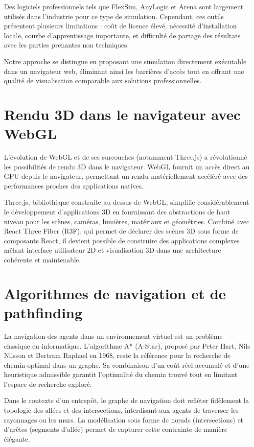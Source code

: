 \documentclass[12pt,a4paper]{report}
\begin{document}
Des logiciels professionnels tels que FlexSim, AnyLogic et Arena sont largement utilis\'es dans l'industrie pour ce type de simulation. Cependant, ces outils pr\'esentent plusieurs limitations : co\^ut de licence \'elev\'e, n\'ecessit\'e d'installation locale, courbe d'apprentissage importante, et difficult\'e de partage des r\'esultats avec les parties prenantes non techniques.

Notre approche se distingue en proposant une simulation directement ex\'ecutable dans un navigateur web, \'eliminant ainsi les barri\`eres d'acc\`es tout en offrant une qualit\'e de visualisation comparable aux solutions professionnelles.

\section{Rendu 3D dans le navigateur avec WebGL}

L'\'evolution de WebGL et de ses surcouches (notamment Three.js) a r\'evolutionn\'e les possibilit\'es de rendu 3D dans le navigateur. WebGL fournit un acc\`es direct au GPU depuis le navigateur, permettant un rendu mat\'eriellement acc\'el\'er\'e avec des performances proches des applications natives.

Three.js, biblioth\`eque construite au-dessus de WebGL, simplifie consid\'erablement le d\'eveloppement d'applications 3D en fournissant des abstractions de haut niveau pour les sc\`enes, cam\'eras, lumi\`eres, mat\'eriaux et g\'eom\'etries. Combin\'e avec React Three Fiber (R3F), qui permet de d\'eclarer des sc\`enes 3D sous forme de composants React, il devient possible de construire des applications complexes m\^elant interface utilisateur 2D et visualisation 3D dans une architecture coh\'erente et maintenable.

\section{Algorithmes de navigation et de pathfinding}

La navigation des agents dans un environnement virtuel est un probl\`eme classique en informatique. L'algorithme A* (A-Star), propos\'e par Peter Hart, Nils Nilsson et Bertram Raphael en 1968, reste la r\'ef\'erence pour la recherche de chemin optimal dans un graphe. Sa combinaison d'un co\^ut r\'eel accumul\'e et d'une heuristique admissible garantit l'optimalit\'e du chemin trouv\'e tout en limitant l'espace de recherche explor\'e.

Dans le contexte d'un entrep\^ot, le graphe de navigation doit refl\'eter fid\`element la topologie des all\'ees et des intersections, interdisant aux agents de traverser les rayonnages ou les murs. La mod\'elisation sous forme de n\oe uds (intersections) et d'ar\^etes (segments d'all\'ee) permet de capturer cette contrainte de mani\`ere \'el\'egante.
\end{document}
